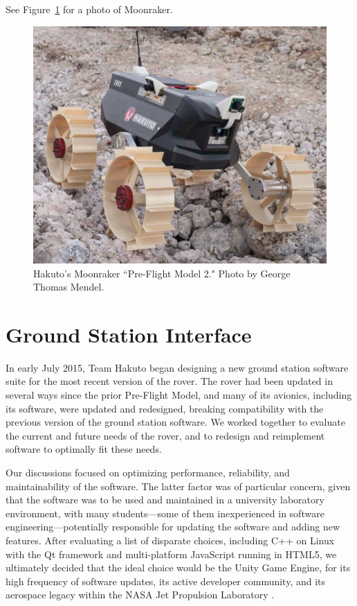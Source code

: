 See Figure~\ref{fig:moonraker} for a photo of Moonraker.

\begin{figure}[h]
\centering
    \includegraphics[width=\columnwidth]{images/moonraker.jpg}
    \caption{Hakuto's Moonraker ``Pre-Flight Model 2." Photo by George Thomas Mendel.}
    \label{fig:moonraker}
\end{figure}

\section{Ground Station Interface}

In early July 2015, Team Hakuto began designing a new ground station software suite for the most recent version of the rover. The rover had been updated in several ways since the prior Pre-Flight Model, and many of its avionics, including its software, were updated and redesigned, breaking compatibility with the previous version of the ground station software. We worked together to evaluate the current and future needs of the rover, and to redesign and reimplement software to optimally fit these needs.

Our discussions focused on optimizing performance, reliability, and maintainability of the software. The latter factor was of particular concern, given that the software was to be used and maintained in a university laboratory environment, with many students---some of them inexperienced in software engineering---potentially responsible for updating the software and adding new features. After evaluating a list of disparate choices, including C++ on Linux with the Qt framework and multi-platform JavaScript running in HTML5, we ultimately decided that the ideal choice would be the Unity Game Engine, for its high frequency of software updates, its active developer community, and its aerospace legacy within the NASA Jet Propulsion Laboratory \cite{jplunity}. 


